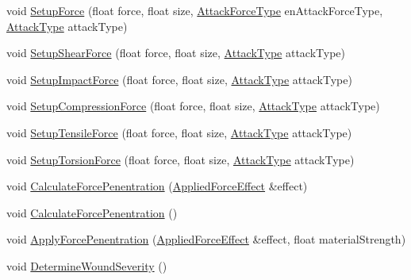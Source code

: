 \begin{DoxyCompactItemize}
\item 
void \mbox{\hyperlink{class_material_aa2951eaa13d1f8137cc228ccc9b0c33c}{Setup\+Force}} (float force, float size, \mbox{\hyperlink{_enum_types_8hpp_ad893f9959c49f07fb713f13630b7ee2d}{Attack\+Force\+Type}} en\+Attack\+Force\+Type, \mbox{\hyperlink{_enum_types_8hpp_a904b2f9c8f3951116c343784c59d6afe}{Attack\+Type}} attack\+Type)
\item 
void \mbox{\hyperlink{class_material_a65d6bf35a560e97da3468e91178facdc}{Setup\+Shear\+Force}} (float force, float size, \mbox{\hyperlink{_enum_types_8hpp_a904b2f9c8f3951116c343784c59d6afe}{Attack\+Type}} attack\+Type)
\item 
void \mbox{\hyperlink{class_material_a0306582d701642b867f9c53c769ffaf7}{Setup\+Impact\+Force}} (float force, float size, \mbox{\hyperlink{_enum_types_8hpp_a904b2f9c8f3951116c343784c59d6afe}{Attack\+Type}} attack\+Type)
\item 
void \mbox{\hyperlink{class_material_a9fa7b190d0621069612e848150e780ee}{Setup\+Compression\+Force}} (float force, float size, \mbox{\hyperlink{_enum_types_8hpp_a904b2f9c8f3951116c343784c59d6afe}{Attack\+Type}} attack\+Type)
\item 
void \mbox{\hyperlink{class_material_a9d67ba42a8823f287b382ea069b7afe9}{Setup\+Tensile\+Force}} (float force, float size, \mbox{\hyperlink{_enum_types_8hpp_a904b2f9c8f3951116c343784c59d6afe}{Attack\+Type}} attack\+Type)
\item 
void \mbox{\hyperlink{class_material_a767010a40d459c05e14afc641217a21b}{Setup\+Torsion\+Force}} (float force, float size, \mbox{\hyperlink{_enum_types_8hpp_a904b2f9c8f3951116c343784c59d6afe}{Attack\+Type}} attack\+Type)
\item 
void \mbox{\hyperlink{class_material_a6b9ea544830218fa7d4e0b23c913a790}{Calculate\+Force\+Penentration}} (\mbox{\hyperlink{struct_applied_force_effect}{Applied\+Force\+Effect}} \&effect)
\item 
void \mbox{\hyperlink{class_material_a9fd060d026e50144ab7ecfd5619e2492}{Calculate\+Force\+Penentration}} ()
\item 
void \mbox{\hyperlink{class_material_af12a8f6e8bba1bffc37036530660cead}{Apply\+Force\+Penentration}} (\mbox{\hyperlink{struct_applied_force_effect}{Applied\+Force\+Effect}} \&effect, float material\+Strength)
\item 
void \mbox{\hyperlink{class_material_a15fdb8ea540098980c76d35bb2595991}{Determine\+Wound\+Severity}} ()
\end{DoxyCompactItemize}
